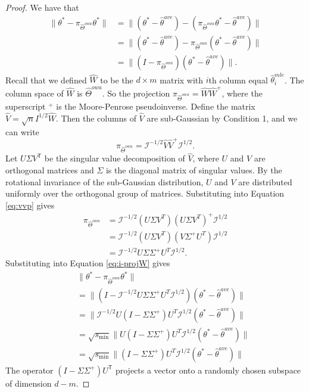 \documentclass[twoside]{article}
\newcommand{\smin}{s_\text{min}}
\newcommand{\matW}{\hat W}
\newcommand{\matV}{\hat V}
\newcommand{\W}{{\hat \Theta^{\textit{owa}}}}
\newcommand{\w}{\theta}
\newcommand{\wave}{\hat\w^{ave}}
\newcommand{\wmle}{\hat\w^{mle}}
\newcommand{\wstar}{{\w^{*}}}
\newcommand{\I}{\mathcal I}
\newcommand{\trans}[1]{\ensuremath{{#1}^{\mathsf{T}}}}
\newcommand{\ltwo}[1]{{\lVert {#1} \rVert}}
\newcommand{\proj}[1]{\pi_{{#1}}}
\begin{document}
\begin{proof}
We have that
\begin{align}
\ltwo{\wstar-\proj\W\wstar}
&=
\ltwo{(\wstar-\wave) - (\proj\W\wstar - \wave)}
\nonumber
\\
&=
\ltwo{(\wstar-\wave) - \proj\W(\wstar - \wave)}
\nonumber
\\
&=
\ltwo{(I-\proj\W)(\wstar - \wave)}
.
\label{eq:i-projW}
\end{align}
Recall that we defined $\matW$ to be the $d\times m$ matrix with $i$th column equal $\wmle_i$.
The column space of $\matW$ is $\W$.
So the projection $\proj\W = \matW\matW^+$, where the superscript $^+$ is the Moore-Penrose pseudoinverse.
Define the matrix $\matV=\sqrt{n}I^{1/2}\matW$.
Then the columns of $\matV$ are sub-Gaussian by Condition 1,
and we can write
\begin{equation}
\proj\W
= \I^{-1/2} \matV \matV ^+ \I^{1/2}
.
\label{eq:vvp}
\end{equation}
Let $U\Sigma \trans V$ be the singular value decomposition of $\matV$,
where $U$ and $V$ are orthogonal matrices and $\Sigma$ is the diagonal matrix of singular values.
By the rotational invariance of the sub-Gaussian distribution,
$U$ and $V$ are distributed uniformly over the orthogonal group of matrices.
Substituting into Equation \ref{eq:vvp} gives
\begin{align}
\proj\W
&= \I^{-1/2} (U\Sigma V^T)(U \Sigma V^T) ^+ \I^{1/2}
\\
&= \I^{-1/2} (U\Sigma V^T)(V \Sigma^+ U^T) \I^{1/2}
\\
&= \I^{-1/2} U\Sigma \Sigma^+ U^T \I^{1/2}
.
\label{eq:vvp}
\end{align}
Substituting into Equation \ref{eq:i-projW} gives
\begin{align}
~~~~~&\!\!\!\!\!\!\!\!\!\!\!\ltwo{\wstar-\proj\W\wstar}
\nonumber
\\
&=
\ltwo{(I-\I^{-1/2} U\Sigma \Sigma^+ U^T \I^{1/2})(\wstar - \wave)}
\\
&=
\ltwo{\I^{-1/2} U(I-\Sigma \Sigma^+ )U^T \I^{1/2}(\wstar - \wave)}
\\
&=
\sqrt{\smin}\ltwo{U(I-\Sigma \Sigma^+ )U^T \I^{1/2}(\wstar - \wave)}
\\
&=
\sqrt{\smin}\ltwo{(I-\Sigma \Sigma^+ )U^T \I^{1/2}(\wstar - \wave)}
\end{align}
The operator $(I-\Sigma\Sigma^+)\trans U$ projects a vector onto a randomly chosen subspace of dimension $d-m$.

\end{proof}
\end{document}

